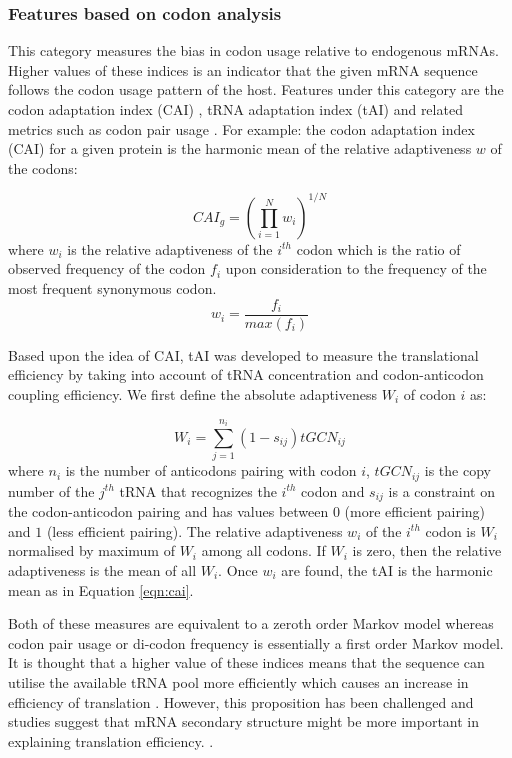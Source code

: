 

\subsubsection{Features based on codon analysis}
This category measures the bias in codon usage relative  to endogenous mRNAs. Higher values of these indices is an indicator that the given mRNA sequence follows the codon usage pattern of the host. Features under this category are the codon adaptation index (CAI) \cite{Sharp1987-ed}, tRNA adaptation index (tAI) \cite{ Reis2004-dl, Sabi2014-je} and related metrics such as codon pair usage \cite{Gutman1989-pn}. For example: the codon adaptation index (CAI) for a given protein is the harmonic mean of the relative adaptiveness $w$ of the codons:

\begin{equation}
    CAI_{g}=(\prod_{i=1}^{N} w_i)^{1/N}
    \label{eqn:cai}
\end{equation}
where $w_i$ is the relative adaptiveness of the $i^{th}$ codon which is the ratio of observed frequency of the codon $f_i$ upon consideration to the frequency of the most frequent synonymous codon. $$w_i = \frac{f_i}{max(f_i)}$$ 

Based upon the idea of CAI, tAI was developed to measure the translational efficiency by taking into account of tRNA concentration and codon-anticodon coupling efficiency. We first define the absolute adaptiveness $W_i$ of codon $i$ as:

\begin{equation}
    W_i = \sum_{j=1}^{n_i} (1 - s_{ij})tGCN_{ij}
\end{equation}
where $n_i$ is the number of anticodons pairing with codon $i$, $tGCN_{ij}$ is the copy number of the $j^{th}$ tRNA that recognizes the $i^{th}$ codon and $s_{ij}$ is a constraint on the codon-anticodon pairing and has values between $0$ (more efficient pairing) and $1$ (less efficient pairing). The relative adaptiveness $w_i$ of the $i^{th}$ codon is  $W_i$ normalised by maximum of $W_i$ among all codons. If $W_i$ is zero, then the relative adaptiveness is the mean of all $W_i$. Once $w_i$ are found, the tAI is the harmonic mean as in Equation \ref{eqn:cai}. 


Both of these measures are equivalent to a zeroth order Markov model whereas codon pair usage or di-codon frequency is essentially a first order Markov model. It is thought that a higher value of these indices means that the sequence can utilise the available tRNA pool more efficiently which causes an increase in efficiency of translation \cite{ikemura1985codon, Gutman1989-pn, Sharp1987-ed, Reis2004-dl, Sabi2014-je, Brule2017-mx}. However, this proposition has been challenged and studies suggest that mRNA secondary structure might be more important in explaining translation efficiency.  \cite{Kudla2009-tl, Boel2016-jd, Cambray2018-kn}.